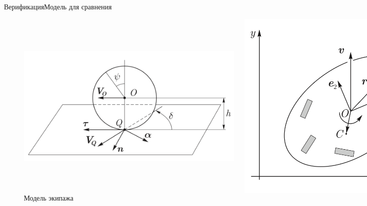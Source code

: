 \documentclass{beamer}
\begin{document}
\begin{frame}{Верификация}{Модель для сравнения}
    \begin{figure}[H]
        \centering
        \begin{columns}
                \centering
                \includegraphics[width=\textwidth]{content/parts/3_friction/diploma/img/art/bor_wheel_scheme.png}
                \caption{Модель колеса}
                \label{fig:bor_wheel_scheme}
                \centering
                \includegraphics[width=\textwidth]{content/parts/3_friction/diploma/img/art/bor_vehicle.png}
                \caption{Модель экипажа}
                \label{fig:bor_vehicle}
        \end{columns}
    \end{figure}
\end{frame}
\end{document}
